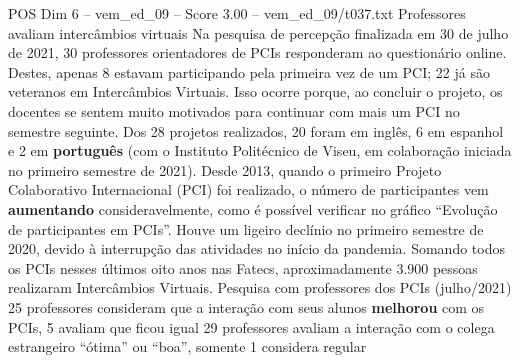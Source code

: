 \begin{textsample}{POS Dim 6 – vem\_ed\_09 – Score 3.00 – vem\_ed\_09/t037.txt}  \label{ex:f6_pos_133}
Professores avaliam intercâmbios virtuais Na pesquisa de percepção finalizada em 30 de julho de 2021, 30 professores orientadores de PCIs responderam ao questionário online.
Destes, apenas 8 estavam participando pela primeira vez de um PCI; 22 já são veteranos em Intercâmbios Virtuais.
Isso ocorre porque, ao concluir o projeto, os docentes se sentem muito motivados para continuar com mais um PCI no semestre seguinte.
Dos 28 projetos realizados, 20 foram em inglês, 6 em espanhol e 2 em \textbf{português} (com o Instituto Politécnico de Viseu, em colaboração iniciada no primeiro semestre de 2021).
Desde 2013, quando o primeiro Projeto Colaborativo Internacional (PCI) foi realizado, o número de participantes vem \textbf{aumentando} consideravelmente, como é possível verificar no gráfico “Evolução de participantes em PCIs”.
Houve um ligeiro declínio no primeiro semestre de 2020, devido à interrupção das atividades no início da pandemia.
Somando todos os PCIs nesses últimos oito anos nas Fatecs, aproximadamente 3.900 pessoas realizaram Intercâmbios Virtuais.
Pesquisa com professores dos PCIs (julho/2021) 25 professores consideram que a interação com seus alunos \textbf{melhorou} com os PCIs, 5 avaliam que ficou igual 29 professores avaliam a interação com o colega estrangeiro “ótima” ou “boa”, somente 1 considera regular

\end{textsample}
